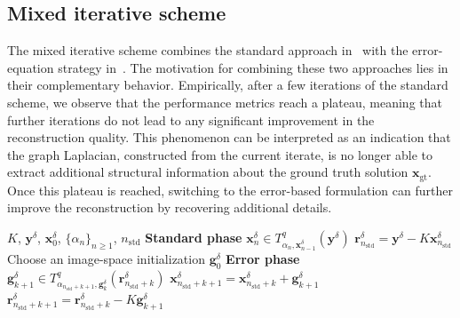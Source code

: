 \documentclass{article}
\theoremstyle{remark}
\newcommand{\gt}{\bm{x}_{\mathrm{gt}}}
\newcommand{\bx}{{\bm{x}}}
\newcommand{\by}{{\bm{y}}}
\newcommand{\br}{{\bm{r}}}
\newcommand{\bg}{{\bm{g}}}
\begin{document}
\subsection{Mixed iterative scheme}\label{sec:mix}
The mixed iterative scheme combines the standard approach in~ with the error-equation strategy in~. The motivation for combining these two approaches lies in their complementary behavior. Empirically, after a few iterations of the standard scheme, we observe that the performance metrics reach a plateau, meaning that further iterations do not lead to any significant improvement in the reconstruction quality. This phenomenon can be interpreted as an indication that the graph Laplacian, constructed from the current iterate, is no longer able to extract additional structural information about the ground truth solution $\gt$. Once this plateau is reached, switching to the error-based formulation can further improve the reconstruction by recovering additional details. 


\begin{algorithm}[t]
\caption{Mixed iterative scheme}\label{alg:mixed-iter}
\begin{algorithmic}[1]
\REQUIRE $K$, $\by^\delta$, $\bx_0^\delta$, $\{\alpha_n\}_{n\ge1}$, $n_{\mathrm{std}}$
\STATE \textbf{Standard phase}
\STATE $\bx_n^\delta \in T^q_{\alpha_n,\bx_{n-1}^\delta}(\by^\delta)$
\ENDFOR
\STATE $\br_{n_{\mathrm{std}}}^\delta=\by^\delta-K\bx_{n_{\mathrm{std}}}^\delta$
\STATE Choose an image-space initialization $\bg_0^\delta$
\STATE \textbf{Error phase}
\STATE $\bg_{k+1}^\delta\in T^q_{\alpha_{n_{\mathrm{std}}+k+1},\bg_k^\delta}(\br_{n_{\mathrm{std}}+k}^\delta)$
\STATE $\bx_{n_{\mathrm{std}}+k+1}^\delta=\bx_{n_{\mathrm{std}}+k}^\delta+\bg_{k+1}^\delta$
\STATE $\br_{n_{\mathrm{std}}+k+1}^\delta=\br_{n_{\mathrm{std}}+k}^\delta-K\bg_{k+1}^\delta$
\ENDFOR
\end{algorithmic}
\end{algorithm}
\end{document}
